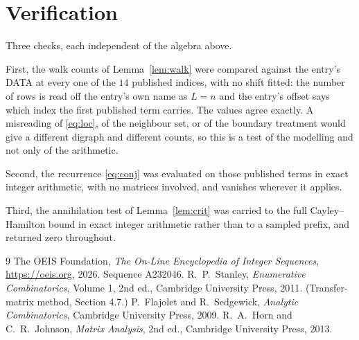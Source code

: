\documentclass[11pt,a4paper]{article}
\theoremstyle{plain}
\theoremstyle{definition}
\begin{document}
\section{Verification}

Three checks, each independent of the algebra above.

First, the walk counts of Lemma~\ref{lem:walk} were compared against the entry's DATA at
every one of the $14$ published indices, with no shift fitted: the number of rows is
read off the entry's own name as $L=n$ and the entry's offset says which index the first
published term carries. The values agree exactly. A misreading of \eqref{eq:loc}, of the
neighbour set, or of the boundary treatment would give a different digraph and different
counts, so this is a test of the modelling and not only of the arithmetic.

Second, the recurrence \eqref{eq:conj} was evaluated on those published terms in exact
integer arithmetic, with no matrices involved, and vanishes wherever it applies.

Third, the annihilation test of Lemma~\ref{lem:crit} was carried to the full
Cayley--Hamilton bound in exact integer arithmetic rather than to a sampled prefix, and
returned zero throughout.

\begin{thebibliography}{9}
 The OEIS Foundation, \emph{The On-Line Encyclopedia of Integer
Sequences}, \url{https://oeis.org}, 2026. Sequence A232046.
 R.~P.~Stanley, \emph{Enumerative Combinatorics}, Volume 1, 2nd ed.,
Cambridge University Press, 2011. (Transfer-matrix method, Section 4.7.)
 P.~Flajolet and R.~Sedgewick, \emph{Analytic Combinatorics}, Cambridge
University Press, 2009.
 R.~A.~Horn and C.~R.~Johnson, \emph{Matrix Analysis}, 2nd ed., Cambridge
University Press, 2013.
\end{thebibliography}
\end{document}
